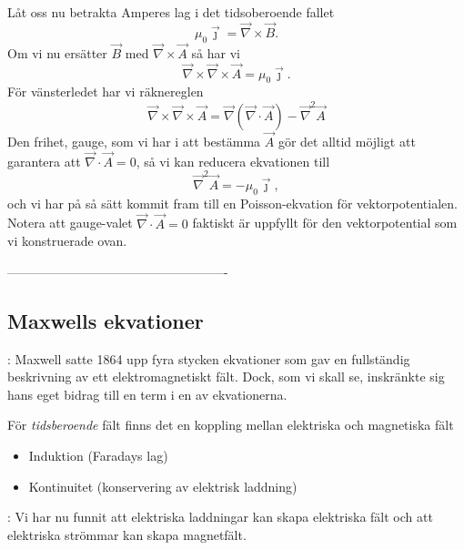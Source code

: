 \documentclass[%
oneside,                 %
final,                   %
10pt]{article}
\newcommand{\longinlinecomment}[3]{{\color{red}{\bf #1}: #2}}
\begin{document}
Låt oss nu betrakta Amperes lag i det tidsoberoende fallet
\begin{equation}
  \mu_0 \vec{\jmath} =  \vec{\nabla} \times \vec{B}.
\end{equation}
Om vi nu ersätter $\vec{B}$ med $\vec{\nabla} \times \vec{A}$ så har vi
\begin{equation}
  \vec{\nabla} \times \vec{\nabla} \times \vec{A} = \mu_0\vec{\jmath}.
\end{equation}
För vänsterledet har vi räknereglen
\begin{equation}
  \vec{\nabla} \times \vec{\nabla} \times \vec{A} =
\vec{\nabla}\left(\vec{\nabla}\cdot\vec{A}\right) -\vec{\nabla}^2\vec{A}
\end{equation}
Den frihet, gauge, som vi har i att bestämma $\vec{A}$ gör det alltid möjligt att garantera att $\vec{\nabla} \cdot \vec{A} = 0$, så vi kan reducera ekvationen till
\begin{equation}
  \vec{\nabla}^2 \vec{A} = -\mu_0 \vec{\jmath},
\end{equation}
och vi har på så sätt kommit fram till en Poisson-ekvation för vektorpotentialen. Notera att gauge-valet $\vec{\nabla} \cdot \vec{A} = 0$ faktiskt är uppfyllt för den vektorpotential som vi konstruerade ovan.

----------------------------------------------------

\subsection{Maxwells ekvationer}

\longinlinecomment{Comment 2}{ Maxwell satte 1864 upp fyra stycken ekvationer som gav en fullständig beskrivning av ett elektromagnetiskt fält.  Dock, som vi skall se, inskränkte sig hans eget bidrag till en term i en av ekvationerna. }{ Maxwell satte 1864 upp }

För \emph{tidsberoende} fält finns det en koppling mellan elektriska och magnetiska fält
\begin{itemize}
\item Induktion (Faradays lag)

\item Kontinuitet (konservering av elektrisk laddning)
\end{itemize}

\noindent
\longinlinecomment{Comment 3}{ Vi har nu funnit att elektriska laddningar kan skapa elektriska fält  och att elektriska strömmar kan skapa magnetfält. }{ Vi har nu funnit }
\end{document}
